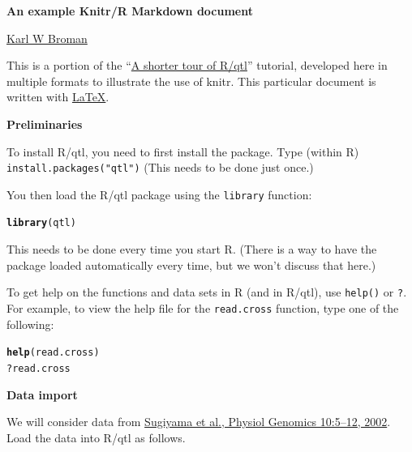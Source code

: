 \documentclass[12pt]{article}\usepackage[]{graphicx}\usepackage[]{color}
\makeatletter
\newcommand{\hlopt}[1]{\textcolor[rgb]{0,0,0}{#1}}%
\newcommand{\hlstd}[1]{\textcolor[rgb]{0.345,0.345,0.345}{#1}}%
\newcommand{\hlkwd}[1]{\textcolor[rgb]{0.737,0.353,0.396}{\textbf{#1}}}%
\newenvironment{kframe}{%
 \def\at@end@of@kframe{}%
 \ifinner\ifhmode%
  \def\at@end@of@kframe{\end{minipage}}%
  \begin{minipage}{\columnwidth}%
 \fi\fi%
 \def\FrameCommand##1{\hskip\@totalleftmargin \hskip-\fboxsep
 \colorbox{shadecolor}{##1}\hskip-\fboxsep
     \hskip-\linewidth \hskip-\@totalleftmargin \hskip\columnwidth}%
 \MakeFramed {\advance\hsize-\width
   \@totalleftmargin\z@ \linewidth\hsize
   \@setminipage}}%
 {\par\unskip\endMakeFramed%
 \at@end@of@kframe}
\newenvironment{knitrout}{}{} %
\makeatother
\begin{document}
{\sffamily \textbf{An example Knitr/R Markdown document}}

\href{http://kbroman.org}{Karl W Broman}

This is a portion of the ``\href{http://www.rqtl.org/rqtltour2.pdf}{A shorter tour of R/qtl}''
tutorial, developed here in multiple formats to illustrate the use of knitr.
This particular document is written with \href{http://www.latex-project.org}{LaTeX}.



\bigskip
{\sffamily \textbf{Preliminaries}}
\nopagebreak

To install R/qtl, you need to first install the package.
Type (within R) {\tt install.packages("qtl")}
(This needs to be done just once.)

You then load the R/qtl package using the {\tt library} function:

\begin{knitrout}
\color{fgcolor}\begin{kframe}
\begin{alltt}
\hlkwd{library}\hlstd{(qtl)}
\end{alltt}
\end{kframe}
\end{knitrout}

This needs to be done every time you start R. (There is a way to
have the package loaded automatically every time, but we won't discuss
that here.)

To get help on the functions and data sets in R
(and in R/qtl), use {\tt help()} or {\tt ?}. For example, to view the help
file for the {\tt read.cross} function, type one of the following:

\begin{knitrout}
\color{fgcolor}\begin{kframe}
\begin{alltt}
\hlkwd{help}\hlstd{(read.cross)}
\hlopt{?}\hlstd{read.cross}
\end{alltt}
\end{kframe}
\end{knitrout}

\bigskip
{\sffamily \textbf{Data import}}
\nopagebreak

We will consider data from
\href{http://www.ncbi.nlm.nih.gov/pubmed/12118100}{Sugiyama et al.,
Physiol Genomics 10:5--12, 2002}. Load the data into R/qtl as
follows.
\end{document}
